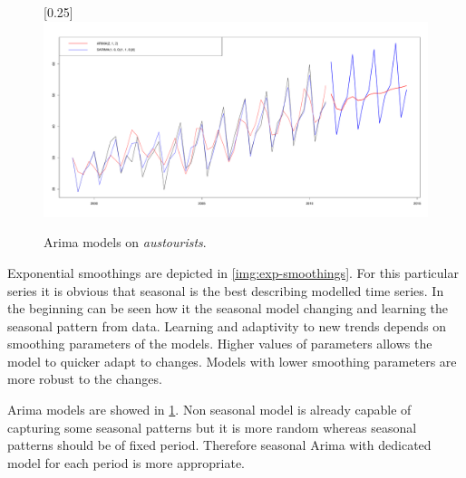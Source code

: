     \begin{figure}[H]
        \begin{center}
            \scalebox{0.255}[0.25]{\includegraphics{img/arima-sarima.pdf}}
            \caption{Arima models on \emph{austourists}.}
            \label{img:arimas}
        \end{center}
    \end{figure}

    Exponential smoothings are depicted in \ref{img:exp-smoothings}. For this particular series it is obvious that
    seasonal is the best describing modelled time series. In the beginning can be seen how it the seasonal model
    changing and learning the seasonal pattern from data. Learning and adaptivity to new trends depends on smoothing
    parameters of the models. Higher values of parameters allows the model to quicker adapt to changes. Models with
    lower smoothing parameters are more robust to the changes.

    Arima models are showed in \ref{img:arimas}. Non seasonal model is already capable of capturing some seasonal
    patterns but it is more random whereas seasonal patterns should be of fixed period. Therefore seasonal Arima with
    dedicated model for each period is more appropriate.

